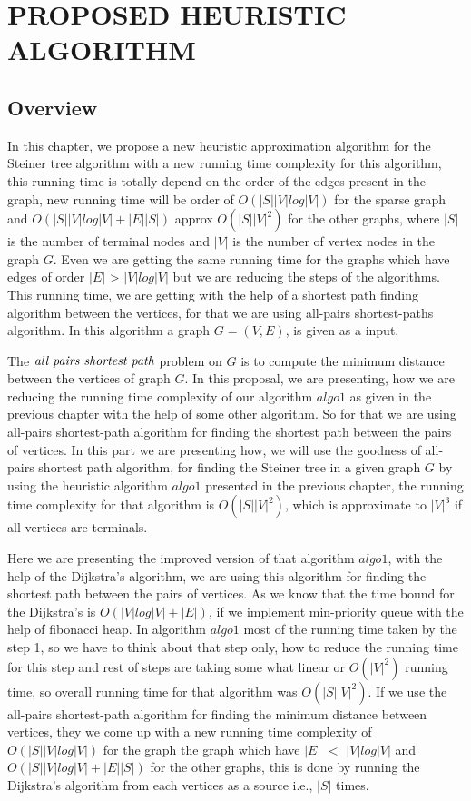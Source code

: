 \chapter{PROPOSED HEURISTIC ALGORITHM} \label{ch_distOracle}
\section{Overview}
In this chapter, we propose a new heuristic approximation algorithm for the Steiner tree algorithm with a new running time complexity for this algorithm, this running time is totally depend on the order of the edges present in the graph, new running time will be order of $O(|S||V|log|V|)$ for the sparse graph and $O(|S||V|log|V| + |E||S|)$ approx $O(|S||V|^2)$ for the other graphs, where $|S|$ is the number of terminal nodes and $|V|$ is the number of vertex nodes in the graph $G$. Even we are getting the same running time for the graphs which have edges of order $|E|$ > $|V|log|V|$ but we are reducing the steps of the algorithms. This running time, we are getting with the help of a shortest path finding algorithm between the vertices, for that we are using all-pairs shortest-paths algorithm. In this algorithm a graph $G = (V,E)$, is given as a input.

 The $\emph{all pairs shortest path}$ problem on $G$ is to compute the minimum distance between the vertices of graph $G$. In this proposal, we are presenting, how we are reducing the running time complexity of our algorithm $algo1$ as given in the previous chapter with the help of some other algorithm. So for that we are using all-pairs shortest-path algorithm for finding the shortest path between the pairs of vertices. In this part we are presenting how, we will use the goodness of all-pairs shortest path algorithm, for finding the Steiner tree in a given graph $G$ by using the heuristic algorithm $algo1$ presented in the previous chapter, the running time complexity for that algorithm is $O(|S||V|^2)$, which is approximate to $|V|^3$ if all vertices are terminals.

 Here we are presenting the improved version of that algorithm $algo1$, with the help of the Dijkstra's algorithm, we are using this algorithm for finding the shortest path between the pairs of vertices. As we know that the time bound for the Dijkstra's is $O(|V|log|V| + |E|)$, if we implement min-priority queue with the help of fibonacci heap. In algorithm $algo1$ most of the running time taken by the step 1, so we have to think about that step only, how to reduce the running time for this step and rest of steps are taking some what linear or $O(|V|^2)$ running time, so overall running time for that algorithm was $O(|S||V|^2)$. If we use the all-pairs shortest-path algorithm for finding the minimum distance between vertices, they we come up with a new running time complexity of $O(|S||V|log|V|)$ for the graph the graph which have $|E|$ $<$ $|V|log|V|$ and $O(|S||V|log|V| + |E||S|)$ for the other graphs, this is done by running the Dijkstra's algorithm from each vertices as a source i.e., $|S|$ times. 

